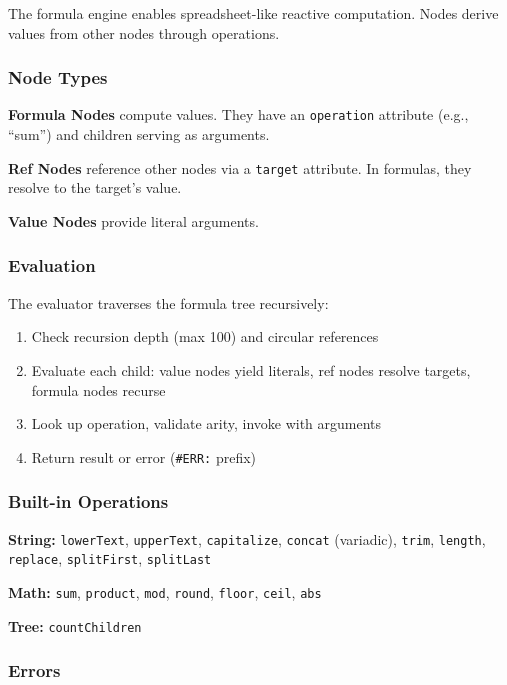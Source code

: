 \documentclass{article}
\begin{document}
The formula engine enables spreadsheet-like reactive computation. Nodes derive values from other nodes through operations.

\subsubsection{Node Types}

\textbf{Formula Nodes} compute values. They have an \texttt{operation} attribute (e.g., ``sum'') and children serving as arguments.

\textbf{Ref Nodes} reference other nodes via a \texttt{target} attribute. In formulas, they resolve to the target's value.

\textbf{Value Nodes} provide literal arguments.

\subsubsection{Evaluation}

The evaluator traverses the formula tree recursively:
\begin{enumerate}
\item Check recursion depth (max 100) and circular references
\item Evaluate each child: value nodes yield literals, ref nodes resolve targets, formula nodes recurse
\item Look up operation, validate arity, invoke with arguments
\item Return result or error (\texttt{\#ERR:} prefix)
\end{enumerate}

\subsubsection{Built-in Operations}

\textbf{String:} \texttt{lowerText}, \texttt{upperText}, \texttt{capitalize}, \texttt{concat} (variadic), \texttt{trim}, \texttt{length}, \texttt{replace}, \texttt{splitFirst}, \texttt{splitLast}

\textbf{Math:} \texttt{sum}, \texttt{product}, \texttt{mod}, \texttt{round}, \texttt{floor}, \texttt{ceil}, \texttt{abs}

\textbf{Tree:} \texttt{countChildren}

\subsubsection{Errors}
\end{document}
